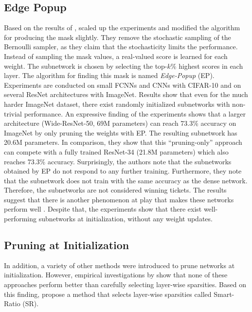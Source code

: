 \subsection{Edge Popup}
Based on the results of \autocite{Supermasks}, \textcite{EdgePopup} scaled up the experiments and modified the algorithm for producing the mask slightly.
They remove the stochastic sampling of the Bernoulli sampler, as they claim that the stochasticity limits the performance. 
Instead of sampling the mask values, a real-valued score is learned for each weight. 
The subnetwork is chosen by selecting the top-$k$\% highest scores in each layer.
The algorithm for finding this mask is named \textit{Edge-Popup} (EP).
Experiments are conducted on small FCNNs and CNNs with CIFAR-10 and on several ResNet architectures with ImageNet.
Results show that even for the much harder ImageNet dataset, there exist randomly initialized subnetworks with non-trivial performance. 
An expressive finding of the experiments shows that a larger architecture (Wide-ResNet-50, 69M parameters) can reach 73.3\% accuracy on ImageNet by only pruning the weights with {EP}.
The resulting subnetwork has 20.6M parameters. In comparison, they show that this “pruning-only” approach can compete with a fully trained ResNet-34 (21.8M parameters) which also reaches 73.3\% accuracy. 
Surprisingly, the authors note that the subnetworks obtained by EP do not respond to any further training.
Furthermore, they note that the subnetwork does not train with the same accuracy as the dense network.
Therefore, the subnetworks are not considered winning tickets.
The results suggest that there is another phenomenon at play that makes these networks perform well \autocite{EdgePopup}.
Despite that, the experiments show that there exist well-performing subnetworks at initialization, without any weight updates.

\subsection{Pruning at Initialization}
In addition, a variety of other methods \autocite{GraSP, SNIP, SynFlow} were introduced to prune networks at initialization. 
However, empirical investigations by \textcite{PruningAtInitMissingTheMark, SanityCheckingPruningMethods} show that none of these approaches perform better than carefully selecting layer-wise sparsities.
Based on this finding, \autocite{SanityCheckingPruningMethods} propose a method that selects layer-wise sparsities called Smart-Ratio (SR).

